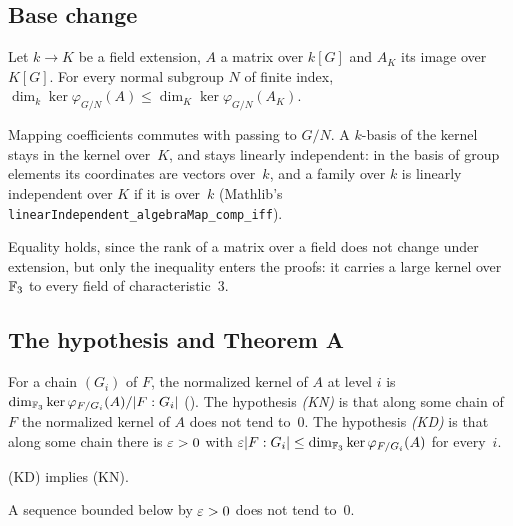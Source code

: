 \subsection{Base change}\label{sec:basechange}

\begin{lemma}\label{lem:basechange}
Let $k\to K$ be a field extension, $A$ a matrix over $k[G]$ and $A_K$ its image over $K[G]$. For every normal subgroup $N$
of finite index, $\dim_k\ker\varphi_{G/N}(A)\le\dim_K\ker\varphi_{G/N}(A_K)$.
\end{lemma}
\begin{outline}
Mapping coefficients commutes with passing to $G/N$. A $k$-basis of the kernel stays in the kernel over~$K$, and stays
linearly independent: in the basis of group elements its coordinates are vectors over~$k$, and a family over $k$ is
linearly independent over $K$ if it is over~$k$ (Mathlib's \texttt{linearIndependent\_algebraMap\_comp\_iff}).
\end{outline}

Equality holds, since the rank of a matrix over a field does not change under extension, but only the inequality enters
the proofs: it carries a large kernel over $\mathbb{F}_3$ to every field of characteristic~$3$.

\subsection{The hypothesis and Theorem A}\label{sec:thmA}

\begin{definition}\label{def:hypothesis}
For a chain $(G_i)$ of $F$, the normalized kernel of $A$ at level $i$ is
$\dim_{\mathbb{F}_3}\ker\varphi_{F/G_i}(A)/\lvert F:G_i \rvert$ (). The hypothesis \emph{(KN)} is that along some
chain of~$F$ the normalized kernel of $A$ does not tend to~$0$. The hypothesis \emph{(KD)} is that along some chain there is $\varepsilon>0$ with
$\varepsilon\lvert F:G_i \rvert\le\dim_{\mathbb{F}_3}\ker\varphi_{F/G_i}(A)$ for every~$i$.
\end{definition}

\begin{lemma}\label{lem:KDtoKN}
(KD) implies (KN).
\end{lemma}
\begin{outline}
A sequence bounded below by $\varepsilon>0$ does not tend to~$0$.
\end{outline}

